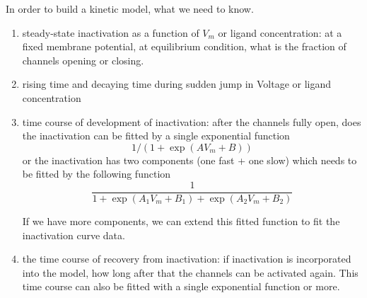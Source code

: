 In order to build a kinetic model, what we need to know.
\begin{enumerate}
  \item steady-state inactivation as a function of $V_m$ or ligand
  concentration:
  at a fixed membrane potential, at equilibrium condition, what is the fraction of channels opening
  or closing.
  \item rising time and decaying time during sudden jump in Voltage or ligand
  concentration
  \item time course of development of inactivation: after the channels fully
  open, does the inactivation can be fitted by a single exponential function
\begin{equation}
1/(1+\exp(AV_m+B))
\end{equation}
  or the inactivation has two components (one fast + one
  slow) which needs to be fitted by the following function
\begin{equation}
\frac{1}{1+\exp(A_1V_m+B_1)+\exp(A_2V_m+B_2)}
\end{equation}

 If we have more components,  we can extend this fitted function to fit the
 inactivation curve data.

  \item the time course of recovery from inactivation: if inactivation is
  incorporated into the model, how long after that the channels can be activated
  again. This time course can also be fitted with a single exponential function
  or more.
\end{enumerate}

